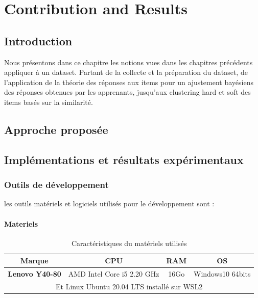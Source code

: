 
\chapter{Contribution and Results}
\minitoc
\thispagestyle{empty}
\newpage

\section{Introduction}
Nous présentons dans ce chapitre les notions vues dans les chapitres précédents appliquer à un dataset. Partant de la collecte et la préparation du dataset, de l’application de la théorie des réponses aux items pour un ajustement bayésiens des réponses obtenues par les apprenants, jusqu’aux clustering hard et soft des items basés sur la similarité.

\section{Approche proposée}


\section{Implémentations et résultats expérimentaux}

\subsection{Outils de développement}
les outils matériels et logiciels utilisés pour le développement sont :

\subsubsection{Materiels}

\begin{table}[H]
  \centering
  \begin{tabular}{cccc}
    \toprule
     \textbf{Marque} & \textbf{CPU} & \textbf{RAM} & \textbf{OS} \\
     \midrule
       \textbf{Lenovo Y40-80} & AMD Intel Core i5 2.20 GHz & 16Go & Windows10 64bits \\ \hline
       \multicolumn{4}{m{14cm}}{\centering Et Linux Ubuntu 20.04 LTS installé sur WSL2 }\\
    \bottomrule
  \end{tabular}
  \caption{Caractéristiques du matériels utilisés}
  \label{tabmat}
\end{table}

